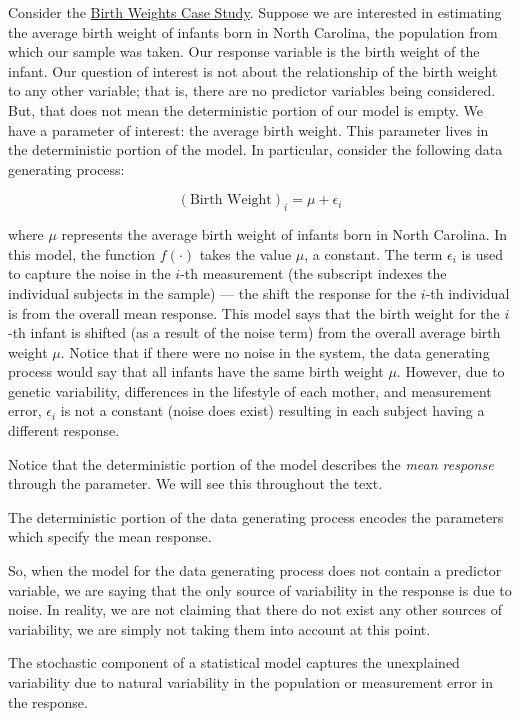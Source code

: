 \documentclass[]{book}
\theoremstyle{plain}
\theoremstyle{mydefn}
\theoremstyle{myexmpl}
\theoremstyle{remark}
\let\BeginKnitrBlock\begin \let\EndKnitrBlock\end
\let\BeginKnitrBlock\begin \let\EndKnitrBlock\end
\begin{document}
Consider the \protect\hyperlink{CaseBabies}{Birth Weights Case Study}.
Suppose we are interested in estimating the average birth weight of
infants born in North Carolina, the population from which our sample was
taken. Our response variable is the birth weight of the infant. Our
question of interest is not about the relationship of the birth weight
to any other variable; that is, there are no predictor variables being
considered. But, that does not mean the deterministic portion of our
model is empty. We have a parameter of interest: the average birth
weight. This parameter lives in the deterministic portion of the model.
In particular, consider the following data generating process:

\[(\text{Birth Weight})_i = \mu + \epsilon_i\]

where \(\mu\) represents the average birth weight of infants born in
North Carolina. In this model, the function \(f(\cdot)\) takes the value
\(\mu\), a constant. The term \(\epsilon_i\) is used to capture the
noise in the \(i\)-th measurement (the subscript indexes the individual
subjects in the sample) --- the shift the response for the \(i\)-th
individual is from the overall mean response. This model says that the
birth weight for the \(i\)-th infant is shifted (as a result of the
noise term) from the overall average birth weight \(\mu\). Notice that
if there were no noise in the system, the data generating process would
say that all infants have the same birth weight \(\mu\). However, due to
genetic variability, differences in the lifestyle of each mother, and
measurement error, \(\epsilon_i\) is not a constant (noise does exist)
resulting in each subject having a different response.

Notice that the deterministic portion of the model describes the
\emph{mean response} through the parameter. We will see this throughout
the text.

\BeginKnitrBlock{rmdtip}
The deterministic portion of the data generating process encodes the
parameters which specify the mean response.
\EndKnitrBlock{rmdtip}

So, when the model for the data generating process does not contain a
predictor variable, we are saying that the only source of variability in
the response is due to noise. In reality, we are not claiming that there
do not exist any other sources of variability, we are simply not taking
them into account at this point.

\BeginKnitrBlock{rmdkeyidea}
The stochastic component of a statistical model captures the unexplained
variability due to natural variability in the population or measurement
error in the response.
\EndKnitrBlock{rmdkeyidea}
\end{document}
